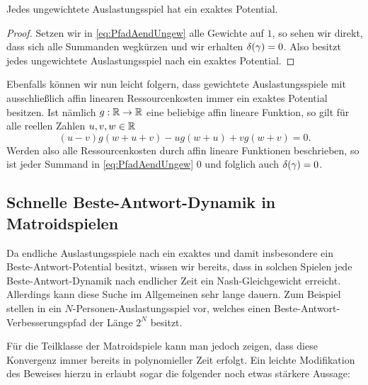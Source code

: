 \begin{kor}
	Jedes ungewichtete Auslastungsspiel hat ein exaktes Potential.
\end{kor}

\begin{proof}
	Setzen wir in \eqref{eq:PfadAendUngew} alle Gewichte auf $1$, so sehen wir direkt, dass sich alle Summanden wegkürzen und wir erhalten $\delta(\gamma) = 0$. Also besitzt jedes ungewichtete Auslastungsspiel nach  ein exaktes Potential.
\end{proof}

Ebenfalls können wir nun leicht folgern, dass gewichtete Auslastungsspiele mit ausschließlich affin linearen Ressourcenkosten immer ein exaktes Potential besitzen. Ist nämlich $g: \mathbb{R}\to \mathbb{R}$ eine beliebige affin lineare Funktion, so gilt für alle reellen Zahlen $u,v,w \in \mathbb{R}$
	\[(u-v)g(w+u+v) - u g(w+u) + v g(w+v) = 0.\]
Werden also alle Ressourcenkosten durch affin lineare Funktionen beschrieben, so ist jeder Summand in \eqref{eq:PfadAendUngew} $0$ und folglich auch $\delta(\gamma) = 0$.




\begin{kor}
\end{kor}



\subsection{Schnelle Beste-Antwort-Dynamik in Matroidspielen}

Da endliche Auslastungsspiele nach  ein exaktes und damit insbesondere ein Beste-Antwort-Potential besitzt, wissen wir bereits, dass in solchen Spielen jede Beste-Antwort-Dynamik nach endlicher Zeit ein Nash-Gleichgewicht erreicht. Allerdings kann diese Suche im Allgemeinen sehr lange dauern. Zum Beispiel stellen \citeauthor{BAPfadLaengeInAusl} in \cite[Theorem 3.1]{BAPfadLaengeInAusl} ein $N$-Personen-Auslastungsspiel vor, welches einen Beste-Antwort-Verbesserungspfad der Länge $2^N$ besitzt.

Für die Teilklasse der Matroidspiele kann man jedoch zeigen, dass diese Konvergenz immer bereits in polynomieller Zeit erfolgt. Ein leichte Modifikation des Beweises hierzu in \cite[Theorem 2.5]{BAPfadLaengeInAusl} erlaubt sogar die folgender noch etwas stärkere Aussage:

